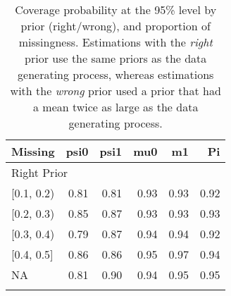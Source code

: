 \begin{table}[ht]
\centering
\begin{tabular}{lrrrrr}
  \toprule
Missing & psi0 & psi1 & mu0 & m1 & Pi \\ 
  \midrule
\multicolumn{6}{l}{Right Prior}\\
{[0.1, 0.2)} & 0.81 & 0.81 & 0.93 & 0.93 & 0.92 \\ 
  {[0.2, 0.3)} & 0.85 & 0.87 & 0.93 & 0.93 & 0.93 \\ 
  {[0.3, 0.4)} & 0.79 & 0.87 & 0.94 & 0.94 & 0.92 \\ 
  {[0.4, 0.5]} & 0.86 & 0.86 & 0.95 & 0.97 & 0.94 \\ 
  {NA} & 0.81 & 0.90 & 0.94 & 0.95 & 0.95 \\ 
   \bottomrule
\multicolumn{6}{l}{}\\
\end{tabular}
\caption{Coverage probability at the 95\% level by prior (right/wrong), and proportion of missingness. Estimations with the \emph{right} prior use the same priors as the data generating process, whereas estimations with the \emph{wrong} prior used a prior that had a mean twice as large as the data generating process.} 
\label{tab:coverage95-method-missigness}
\end{table}
